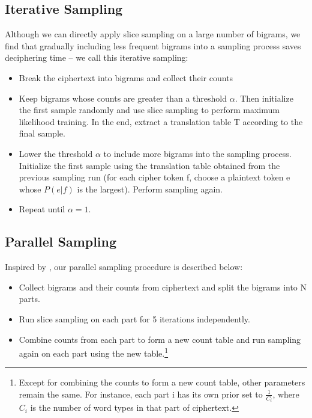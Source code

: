 \subsection{Iterative Sampling}
Although we can directly apply slice sampling on a large number of bigrams, we find that gradually including less frequent bigrams into a sampling process saves deciphering time -- we call this iterative sampling:

 \begin{itemize}
  \item Break the ciphertext into bigrams and collect their counts
  \item Keep bigrams whose counts are greater than a threshold $\alpha$. Then initialize the first sample randomly and use slice sampling to perform maximum likelihood training. In the end, extract a translation table T according to the final sample.
  \item Lower the threshold $\alpha$ to include more bigrams into the sampling process. Initialize the first sample using the translation table obtained from the previous sampling run (for each cipher token f, choose a plaintext token e whose $P(e|f)$ is the largest). Perform sampling again.
  \item Repeat until $\alpha=1$.
\end{itemize}

\subsection{Parallel Sampling}
Inspired by \cite{newman:2009:distributed}, our parallel sampling procedure is described below:

\begin{itemize}
\item Collect bigrams and their counts from ciphertext and split the bigrams into N parts.
\item Run slice sampling on each part for 5 iterations independently.
\item Combine counts from each part to form a new count table and run sampling again on each part using the new table.\footnote{Except for combining the counts to form a new count table, other parameters remain the same. For instance, each part i has its own prior set to $\frac{1}{C_{i}}$, where $C_{i}$ is the number of word types in that part of ciphertext.}
\end{itemize}

